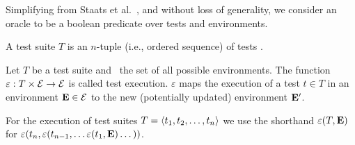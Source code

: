 
Simplifying from Staats
et al.~\cite{staatsetal:ICSE:2011}, and without loss of generality,
we consider an oracle to be a boolean predicate over tests and environments.


\begin{definition}
A test suite\/ $T$ is an $n$-tuple (i.e., ordered sequence) of tests
.

\end{definition}

\begin{definition}
Let\/ $T$ be a test suite and\/ \environs\ the set of all possible
environments.
The function\/ $\varepsilon: T \times \mathcal{E} \rightarrow
\mathcal{E}$ is called test
execution. $\varepsilon$ maps the execution of a test\/ $ t \in T$ 
in an environment\/ $\mathbf{E} \in \mathcal{E}$ to the new (potentially updated)
environment\/ $\mathbf{E}'$.

For the execution of test suites\/ $T =  \langle t_1, t_2, \dots, t_n \rangle $
we use the shorthand\/
$\varepsilon(T,\mathbf{E})$ for $\varepsilon(t_n,\varepsilon(t_{n-1},\dots \varepsilon(t_1,\mathbf{E}) \dots ))$.
\end{definition}

